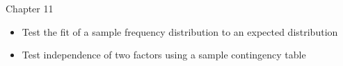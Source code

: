 \documentclass[xcolor=table]{beamer}
\begin{document}
\begin{frame}{Chapter 11}
\begin{block}{}
\large
\begin{itemize}
\item Test the fit of a sample frequency distribution to an expected distribution
\item Test independence of two factors using a sample contingency table

\end{itemize}
\end{block}
\end{frame}
\end{document}

